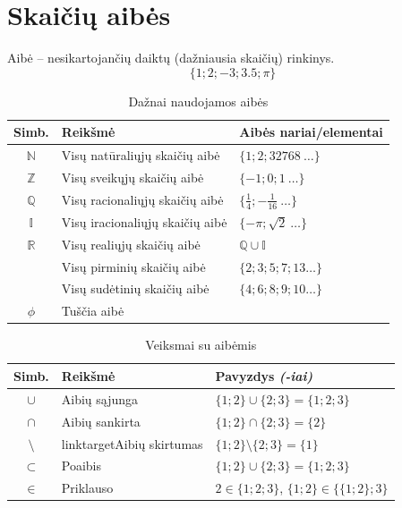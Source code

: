 \documentclass[fleqn]{article} %
\begin{document}
\section{Skaičių aibės}
Aibė -- nesikartojančių daiktų (dažniausia skaičių) rinkinys.
\begin{equation}
\{1; 2; -3; 3.5; \pi\}
\end{equation}

\begin{table}[h]
\begin{tabular}{c|l|l}
    
    Simb. & Reikšmė                                 & Aibės nariai/elementai \\
    \hline
    $\mathbb{N}$ & Visų natūraliųjų skaičių aibė    & $\{1; 2; 32768\:\dots\}$ \\
    $\mathbb{Z}$ & Visų sveikųjų skaičių aibė       & $\{-1; 0; 1\:\dots\}$ \\
    $\mathbb{Q}$ & Visų racionaliųjų skaičių aibė   & $\{\frac{1}{4}; -\frac{1}{16}\:\dots\}$ \\
    $\mathbb{I}$ & Visų iracionaliųjų skaičių aibė  & $\{-\pi; \sqrt{2}\:\dots\}$ \\
    $\mathbb{R}$ & Visų realiųjų skaičių aibė       & $\mathbb{Q} \cup \mathbb{I}$ \\
                 & Visų pirminių skaičių aibė       & $\{2; 3; 5; 7; 13 \dots \}$ \\
                 & Visų sudėtinių skaičių aibė      & $\{4; 6; 8; 9; 10\dots\}$ \\
    $\phi$       & Tuščia aibė                      &
\end{tabular}
\caption[Dažnai naudojamos aibės]{Dažnai naudojamos aibės}
\label{table:data}
\end{table} 

\begin{table}[h]
    \begin{tabular}{c|l|l}
        
        Simb. & Reikšmė                             & Pavyzdys \textit{(-iai)} \\
        \hline
        $\cup$      & Aibių sąjunga                 & $\{1; 2\} \cup \{2; 3\} = \{1; 2; 3\}$ \\
        $\cap$      & Aibių sankirta                & $\{1; 2\} \cap \{2; 3\} = \{2\}$ \\
        $\setminus$ & linktarget{Aibių skirtumas}   & $\{1; 2\} \setminus \{2; 3\} = \{1\}$ \\
        $\subset$   & Poaibis                       & $\{1; 2\} \cup \{2; 3\} = \{1; 2; 3\}$ \\
        $\in$       & Priklauso                     & $2 \in \{1; 2; 3\}$, $\{1; 2\} \in \{\{1; 2\}; 3\}$ \\
    \end{tabular}
    \caption[Veiksmai su aibėmis]{Veiksmai su aibėmis}
\end{table} 
\end{document}
